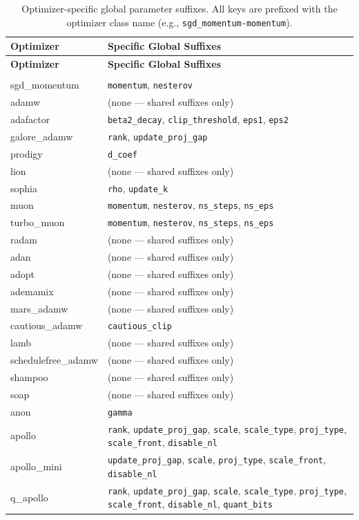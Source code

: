 \begin{longtable}{>{\ttfamily\footnotesize\raggedright\arraybackslash}p{5.2cm}>{\raggedright\arraybackslash}p{9.7cm}}
\toprule
\textbf{Optimizer} & \textbf{Specific Global Suffixes} \\
\midrule
\endfirsthead
\toprule
\textbf{Optimizer} & \textbf{Specific Global Suffixes} \\
\midrule
\endhead
\midrule
\multicolumn{2}{r}{\textit{continued on next page}} \\
\endfoot
\bottomrule
\caption{Optimizer-specific global parameter suffixes. All keys are prefixed with the optimizer class name (e.g., \texttt{sgd\_momentum-momentum}).}
\label{tab:optimizer-specific-suffixes}
\endlastfoot
sgd\_momentum & \texttt{momentum}, \texttt{nesterov} \\
adamw & (none --- shared suffixes only) \\
adafactor & \texttt{beta2\_decay}, \texttt{clip\_threshold}, \texttt{eps1}, \texttt{eps2} \\
galore\_adamw & \texttt{rank}, \texttt{update\_proj\_gap} \\
prodigy & \texttt{d\_coef} \\
lion & (none --- shared suffixes only) \\
sophia & \texttt{rho}, \texttt{update\_k} \\
muon & \texttt{momentum}, \texttt{nesterov}, \texttt{ns\_steps}, \texttt{ns\_eps} \\
turbo\_muon & \texttt{momentum}, \texttt{nesterov}, \texttt{ns\_steps}, \texttt{ns\_eps} \\
radam & (none --- shared suffixes only) \\
adan & (none --- shared suffixes only) \\
adopt & (none --- shared suffixes only) \\
ademamix & (none --- shared suffixes only) \\
mars\_adamw & (none --- shared suffixes only) \\
cautious\_adamw & \texttt{cautious\_clip} \\
lamb & (none --- shared suffixes only) \\
schedulefree\_adamw & (none --- shared suffixes only) \\
shampoo & (none --- shared suffixes only) \\
soap & (none --- shared suffixes only) \\
anon & \texttt{gamma} \\
apollo & \texttt{rank}, \texttt{update\_proj\_gap}, \texttt{scale}, \texttt{scale\_type}, \texttt{proj\_type}, \texttt{scale\_front}, \texttt{disable\_nl} \\
apollo\_mini & \texttt{update\_proj\_gap}, \texttt{scale}, \texttt{proj\_type}, \texttt{scale\_front}, \texttt{disable\_nl} \\
q\_apollo & \texttt{rank}, \texttt{update\_proj\_gap}, \texttt{scale}, \texttt{scale\_type}, \texttt{proj\_type}, \texttt{scale\_front}, \texttt{disable\_nl}, \texttt{quant\_bits} \\
\end{longtable}

